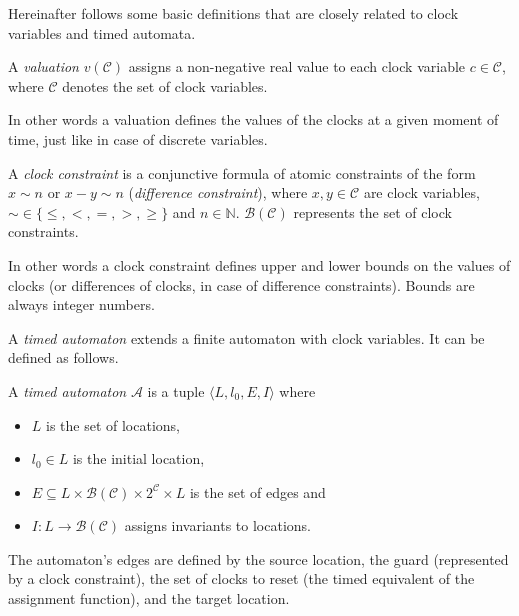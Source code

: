 Hereinafter follows some basic definitions that are closely related to clock variables and timed automata. 

\begin{dfn}
	A \emph{valuation} $v(\mathcal{C})$ assigns a non-negative real value
	to each clock variable $c \in \mathcal{C}$, where $\mathcal{C}$ denotes the set of clock
	variables.
\end{dfn}

In other words a valuation defines the values of the clocks at a given moment of time, just like in case of discrete variables.

\begin{dfn}
	A \emph{clock constraint} is a conjunctive formula of atomic
	constraints of the form $x \sim n$ or $x - y \sim n$ (\emph{difference
		constraint}), where $x,y \in \mathcal{C}$ are clock variables, $\sim \in \{\leq,<,=,>,\geq\}$ and \hbox{$n \in \mathbb{N}$}. $\mathcal{B}(\mathcal{C})$ represents the set of clock
	constraints.
\end{dfn}

In other words a clock constraint defines upper and lower bounds on the values of clocks (or differences of clocks, in case of difference constraints). Bounds are always integer numbers.

A \emph{timed automaton} extends a finite automaton with clock variables. It can be defined as follows.

\begin{dfn}
A \emph{timed automaton} $\mathcal{A}$ is a tuple $\langle L, l_0,
E, I\rangle$ where
\begin{itemize}
	\item $L$ is the set of locations,
	\item $l_0 \in L$ is the initial location,
	\item $E \subseteq L \times \mathcal{B}(\mathcal{C}) \times 2^\mathcal{C} \times L$ is the set of edges and
	\item $I: L \to \mathcal{B}(\mathcal{C})$ assigns invariants to locations. \cite{bengtsson2004timed}
\end{itemize}
\end{dfn}

The automaton's edges are defined by the source location, the guard (represented by a clock constraint), the set of clocks to reset (the timed equivalent of the assignment function), and the target location.


